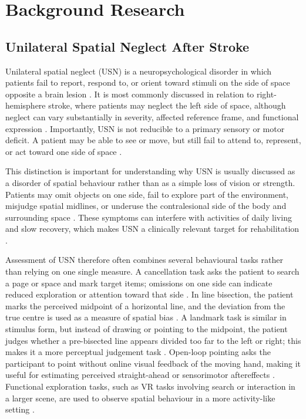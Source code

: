 \chapter{Background Research}
\label{chap:Background}

\section{Unilateral Spatial Neglect After Stroke}
\label{sec:background-usn}

Unilateral spatial neglect (USN) is a neuropsychological disorder in which patients fail to report, respond to, or orient toward stimuli on the side of space opposite a brain lesion \cite{heilman2000neglect,Hendrik_Knoche_Lit_Review}. It is most commonly discussed in relation to right-hemisphere stroke, where patients may neglect the left side of space, although neglect can vary substantially in severity, affected reference frame, and functional expression \cite{heilman2000neglect,Hendrik_Knoche_Lit_Review}. Importantly, USN is not reducible to a primary sensory or motor deficit. A patient may be able to see or move, but still fail to attend to, represent, or act toward one side of space \cite{heilman2000neglect}.

This distinction is important for understanding why USN is usually discussed as a disorder of spatial behaviour rather than as a simple loss of vision or strength. Patients may omit objects on one side, fail to explore part of the environment, misjudge spatial midlines, or underuse the contralesional side of the body and surrounding space \cite{heilman2000neglect,Hendrik_Knoche_Lit_Review}. These symptoms can interfere with activities of daily living and slow recovery, which makes USN a clinically relevant target for rehabilitation \cite{Hendrik_Knoche_Lit_Review,Morse2022}.

Assessment of USN therefore often combines several behavioural tasks rather than relying on one single measure. A cancellation task asks the patient to search a page or space and mark target items; omissions on one side can indicate reduced exploration or attention toward that side \cite{Hendrik_Knoche_Lit_Review}. In line bisection, the patient marks the perceived midpoint of a horizontal line, and the deviation from the true centre is used as a measure of spatial bias \cite{frassinetti2002long,Serino2011}. A landmark task is similar in stimulus form, but instead of drawing or pointing to the midpoint, the patient judges whether a pre-bisected line appears divided too far to the left or right; this makes it a more perceptual judgement task \cite{Serino2011}. Open-loop pointing asks the participant to point without online visual feedback of the moving hand, making it useful for estimating perceived straight-ahead or sensorimotor aftereffects \cite{Serino2011}. Functional exploration tasks, such as VR tasks involving search or interaction in a larger scene, are used to observe spatial behaviour in a more activity-like setting \cite{Hendrik_Knoche_Lit_Review,Morse2022}.

